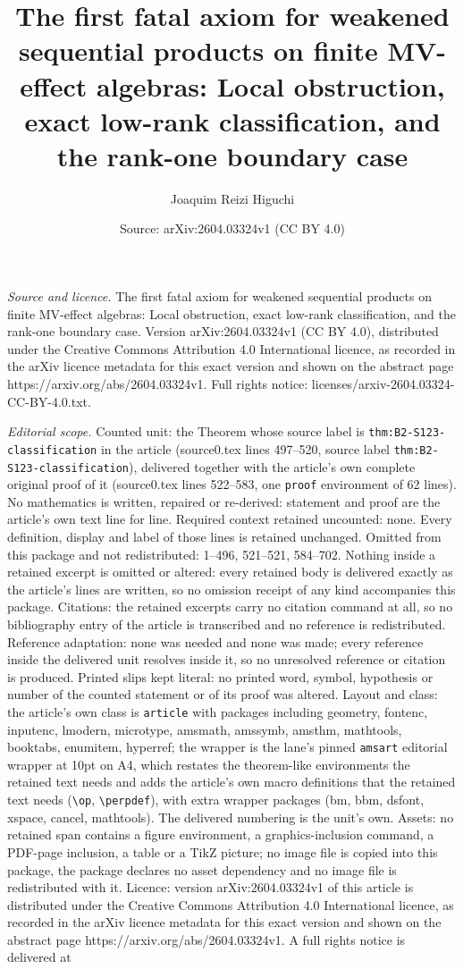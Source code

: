 \documentclass[10pt,a4paper]{amsart}
\title[The first fatal axiom for weakened sequential products on fi]{The first fatal axiom for weakened sequential products on finite MV-effect algebras: Local obstruction, exact low-rank classification, and the rank-one boundary case}
\author{Joaquim Reizi Higuchi}
\date{Source: arXiv:2604.03324v1 (CC BY 4.0)}
\begin{document}
\maketitle

\noindent\emph{Source and licence.} The first fatal axiom for weakened sequential products on finite MV-effect algebras: Local obstruction, exact low-rank classification, and the rank-one boundary case. Version arXiv:2604.03324v1 (CC BY 4.0), distributed under the Creative Commons Attribution 4.0 International licence, as recorded in the arXiv licence metadata for this exact version and shown on the abstract page https://arxiv.org/abs/2604.03324v1. Full rights notice: licenses/arxiv-2604.03324-CC-BY-4.0.txt.\par\smallskip

\noindent\textit{Editorial scope.} Counted unit: the Theorem whose source label is \texttt{thm:B2-S123-classification} in the article (source0.tex lines 497--520, source label \texttt{thm:B2-S123-classification}), delivered together with the article's own complete original proof of it (source0.tex lines 522--583, one \texttt{proof} environment of 62 lines). No mathematics is written, repaired or re-derived: statement and proof are the article's own text line for line. Required context retained uncounted: none. Every definition, display and label of those lines is retained unchanged. Omitted from this package and not redistributed: 1--496, 521--521, 584--702. Nothing inside a retained excerpt is omitted or altered: every retained body is delivered exactly as the article's lines are written, so no omission receipt of any kind accompanies this package. Citations: the retained excerpts carry no citation command at all, so no bibliography entry of the article is transcribed and no reference is redistributed. Reference adaptation: none was needed and none was made; every reference inside the delivered unit resolves inside it, so no unresolved reference or citation is produced. Printed slips kept literal: no printed word, symbol, hypothesis or number of the counted statement or of its proof was altered. Layout and class: the article's own class is \texttt{article} with packages including geometry, fontenc, inputenc, lmodern, microtype, amsmath, amssymb, amsthm, mathtools, booktabs, enumitem, hyperref; the wrapper is the lane's pinned \texttt{amsart} editorial wrapper at 10pt on A4, which restates the theorem-like environments the retained text needs and adds the article's own macro definitions that the retained text needs (\texttt{\textbackslash op}, \texttt{\textbackslash perpdef}), with extra wrapper packages (bm, bbm, dsfont, xspace, cancel, mathtools). The delivered numbering is the unit's own. Assets: no retained span contains a figure environment, a graphics-inclusion command, a PDF-page inclusion, a table or a TikZ picture; no image file is copied into this package, the package declares no asset dependency and no image file is redistributed with it. Licence: version arXiv:2604.03324v1 of this article is distributed under the Creative Commons Attribution 4.0 International licence, as recorded in the arXiv licence metadata for this exact version and shown on the abstract page https://arxiv.org/abs/2604.03324v1. A full rights notice is delivered at 
\end{document}
